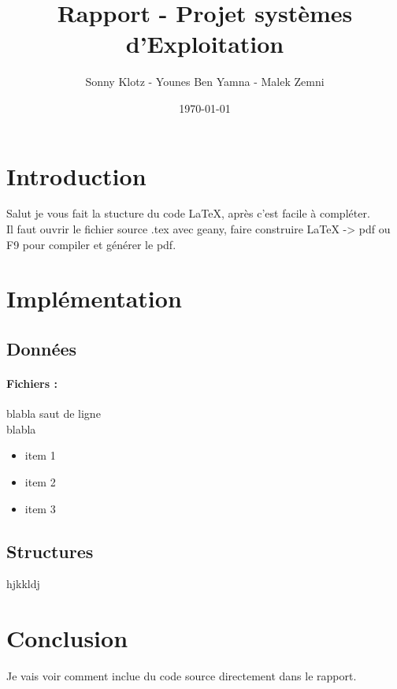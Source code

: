 \documentclass[a4]{article}
\author{Sonny Klotz - Younes Ben Yamna - Malek Zemni}
\title{Rapport - Projet systèmes d'Exploitation}
\date{\today}
\begin{document}
\maketitle
	
	
	\section{Introduction}
			Salut je vous fait la stucture du code LaTeX, après c'est facile à compléter.\\
			Il faut ouvrir le fichier source .tex avec geany, faire construire LaTeX -> pdf ou F9 pour compiler et générer le pdf.
			
	\section{Implémentation}
		\subsection{Données}
			\paragraph{Fichiers :\\}
			blabla saut de ligne\\
			blabla
			\begin{itemize}
			\item item 1
			\item item 2
			\item item 3
			\end{itemize}
		\subsection{Structures}
			hjkkldj
	
	\section{Conclusion}
			Je vais voir comment inclue du code source directement dans le rapport.
\end{document}

